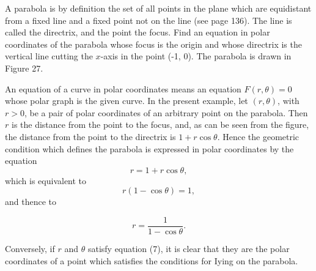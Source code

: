 \begin{example}
A parabola is by definition the set of all points in the plane which are equidistant from a fixed line and a fixed point not on the line (see page 136). The line is called the directrix, and the point the focus. Find an equation in polar coordinates of the parabola whose focus is the origin and whose directrix is the vertical line cutting the $x$-axis in the point (-1, 0). The parabola is drawn in Figure 27.

An equation of a curve in polar coordinates means an equation $F(r, \theta) = 0$ whose polar graph is the given curve. In the present example, let $(r, \theta)$, with $r > 0$, be a pair of polar coordinates of an arbitrary point on the parabola. Then $r$ is the distance from the point to the focus, and, as can be seen from the figure, the distance from the point to the directrix is $1 + r \cos \theta$. Hence the geometric condition which defines the parabola is expressed in polar coordinates by the equation
$$
r = 1 + r \cos \theta, 
$$
\noindent which is equivalent to
$$
r (1 - \cos \theta) = 1, 
$$
\noindent and thence to

\begin{equation}
r = \frac{1}{1 - \cos \theta} .
\label{eq10.6.7}
\end{equation}


\noindent Conversely, if $r$ and $\theta$ satisfy equation (7), it is clear that they are the polar coordinates of a point which satisfies the conditions for Iying on the parabola.
\end{example}


